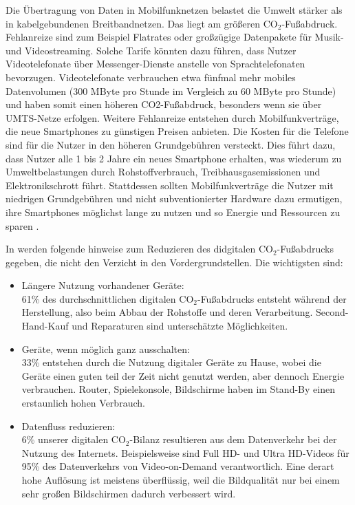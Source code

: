 \documentclass{article}
\begin{document}
Die Übertragung von Daten in Mobilfunknetzen belastet die Umwelt stärker als in kabelgebundenen Breitbandnetzen. Das liegt am größeren CO$_2$-Fußabdruck. 
Fehlanreize sind zum Beispiel Flatrates oder großzügige Datenpakete für Musik- und Videostreaming. Solche Tarife könnten dazu führen, dass Nutzer Videotelefonate über Messenger-Dienste anstelle von Sprachtelefonaten bevorzugen. Videotelefonate verbrauchen etwa fünfmal mehr mobiles Datenvolumen (300 MByte pro Stunde im Vergleich zu 60 MByte pro Stunde) und haben somit einen höheren CO2-Fußabdruck, besonders wenn sie über UMTS-Netze erfolgen.
Weitere Fehlanreize entstehen durch Mobilfunkverträge, die neue Smartphones zu günstigen Preisen anbieten. Die Kosten für die Telefone sind für die Nutzer in den höheren Grundgebühren versteckt. Dies führt dazu, dass Nutzer alle 1 bis 2 Jahre ein neues Smartphone erhalten, was wiederum zu Umweltbelastungen durch Rohstoffverbrauch, Treibhausgasemissionen und Elektronikschrott führt. Stattdessen sollten Mobilfunkverträge die Nutzer mit niedrigen Grundgebühren und nicht subventionierter Hardware dazu ermutigen, ihre Smartphones möglichst lange zu nutzen und so Energie und Ressourcen zu sparen \cite{energieeffizienz_IT_2020}.

In \cite{digitale_leicht_2021} werden folgende hinweise zum Reduzieren des  didgitalen CO$_2$-Fußabdrucks gegeben, die nicht den Verzicht in den Vordergrundstellen.
Die wichtigsten sind:
\begin{itemize}
	\item Längere Nutzung vorhandener Geräte:\\
	    61\% des durchschnittlichen digitalen CO$_2$-Fußabdrucks 
entsteht während der Herstellung, also  beim Abbau
der  Rohstoffe und deren Verarbeitung.  
Second-Hand-Kauf  und Reparaturen sind unterschätzte Möglichkeiten. 
  \item Geräte, wenn möglich ganz ausschalten:\\
	    33\% entstehen durch die  Nutzung digitaler Geräte zu Hause, wobei die Geräte einen guten teil der Zeit nicht genutzt werden, aber dennoch Energie verbrauchen.
			Router, Spielekonsole, Bildschirme haben  im Stand-By einen erstaunlich hohen Verbrauch.
	\item Datenfluss reduzieren:\\
	6\% unserer digitalen CO$_2$-Bilanz resultieren aus dem Datenverkehr bei der Nutzung des Internets. 
	Beispielsweise sind Full HD- und Ultra HD-Videos für 95\% des Datenverkehrs von Video-on-Demand verantwortlich. Eine derart hohe Auflösung ist meistens  überflüssig, weil die Bildqualität nur bei einem sehr großen Bildschirmen dadurch verbessert wird.
\end{itemize}
\end{document}
